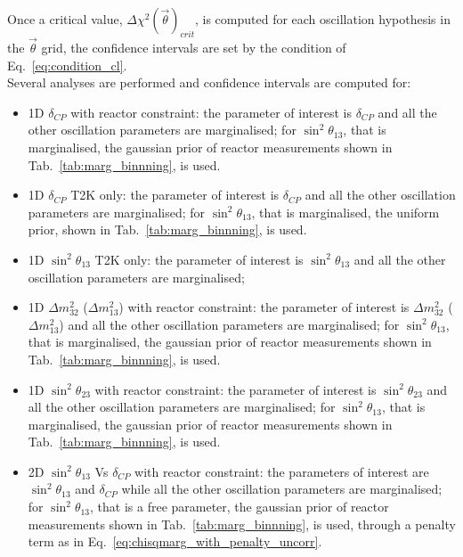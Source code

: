 Once a critical value, $\Delta \chi^2 (\vec{\theta})_{crit}$,
is computed for each oscillation hypothesis in the $\vec{\theta}$ grid,
the confidence intervals are set by the condition of Eq.~\ref{eq:condition_cl}. \\


Several analyses are performed and confidence intervals are computed for:
\begin{itemize}

\item 
1D $\delta_{CP}$ with reactor constraint: 
the parameter of interest is $\delta_{CP}$ and
all the other oscillation parameters are marginalised;
for $\sin^2 \theta_{13}$, that is marginalised,
the gaussian prior of reactor measurements shown in Tab.~\ref{tab:marg_binnning}, is used. 

\item 
1D $\delta_{CP}$ T2K only: 
the parameter of interest is $\delta_{CP}$ and
all the other oscillation parameters are marginalised;
for $\sin^2 \theta_{13}$, that is marginalised, 
the uniform prior, shown in Tab.~\ref{tab:marg_binnning}, is used. 

\item 
1D $\sin^2 \theta_{13}$ T2K only: 
the parameter of interest is $\sin^2 \theta_{13}$ and
all the other oscillation parameters are marginalised;

\item 
1D $\Delta m^2_{32}$ ($\Delta m^2_{13}$) with reactor constraint: 
the parameter of interest is $\Delta m^2_{32}$ ($\Delta m^2_{13}$) and
all the other oscillation parameters are marginalised;
for $\sin^2 \theta_{13}$, that is marginalised,
the gaussian prior of reactor measurements shown in Tab.~\ref{tab:marg_binnning}, is used. 

\item 
1D $\sin^2 \theta_{23}$ with reactor constraint: 
the parameter of interest is $\sin^2 \theta_{23}$ and
all the other oscillation parameters are marginalised;
for $\sin^2 \theta_{13}$, that is marginalised,
the gaussian prior of reactor measurements shown in Tab.~\ref{tab:marg_binnning}, is used. 

%

\item 
2D $\sin^2 \theta_{13}$ Vs $\delta_{CP}$ with reactor constraint: 
the parameters of interest are $\sin^2 \theta_{13}$ and $\delta_{CP}$ while
all the other oscillation parameters are marginalised;
for $\sin^2 \theta_{13}$, that is a free parameter, 
the gaussian prior of reactor measurements shown in Tab.~\ref{tab:marg_binnning}, 
is used, through a penalty term as in Eq.~\ref{eq:chisqmarg_with_penalty_uncorr}.


\end{itemize}
